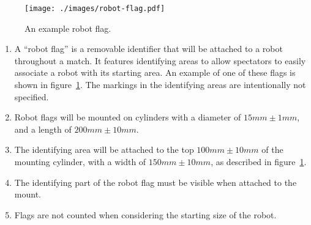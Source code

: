 \begin{figure}
  \centering
  \texttt{[image: ./images/robot-flag.pdf]}
  \caption{An example robot flag.}
  \label{fig:example-flag}
\end{figure}

\begin{enumerate}
  \item A ``robot flag'' is a removable identifier that will be attached to a robot throughout a match.
        It features identifying areas to allow spectators to easily associate a robot with its starting area.
        An example of one of these flags is shown in figure~\ref{fig:example-flag}.
        The markings in the identifying areas are intentionally not specified.

  \item Robot flags will be mounted on cylinders with a diameter of $15mm\pm1mm$,
        and a length of $200mm\pm10mm$.

  \item The identifying area will be attached to the top $100mm\pm10mm$ of the mounting cylinder,
        with a width of $150mm\pm10mm$, as described in figure~\ref{fig:example-flag}.

  \item The identifying part of the robot flag must be visible when attached to the mount.

  \item Flags are not counted when considering the starting size of the robot.
\end{enumerate}


